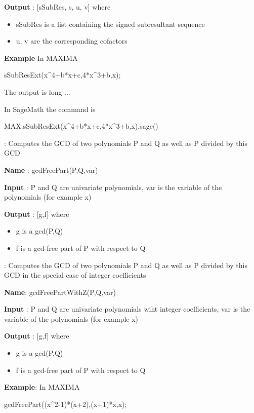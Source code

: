 \documentclass{article}
\begin{document}
  {\bf Output} : [sSubRes, s, u, v] where
  \begin{itemize}
  
    \item sSubRes is a list containing the signed subresultant sequence
    
    \item u, v are the corresponding cofactors
  \end{itemize}
  
{\bf Example} In MAXIMA

sSubResExt(x\^{}4+b*x+c,4*x\^{}3+b,x);

 \noindent The output is long ...
  
  \noindent In SageMath the command is
  
  MAX.sSubResExt(x\^{}4+b*x+c,4*x\^{}3+b,x).sage()
  

:
  Computes the GCD of two polynomials P and Q as well as P divided by this GCD
  
{\bf Name} : gcdFreePart(P,Q,var)
  
  {\bf Input} : P and Q are univariate polynomials, var is the variable of the polynomials (for example x)
  
 {\bf  Output} : [g,f] where
  \begin{itemize}
    \item g is a gcd(P,Q)
    \item f is a gcd-free part of P with respect to Q
  \end{itemize}
  
  :
  Computes the GCD of two polynomials P and Q as well as P divided by this GCD in the special case of integer coefficients
  
  {\bf Name}: gcdFreePartWithZ(P,Q,var)
  
  {\bf Input} : P and Q are univariate polynomials wiht integer coefficients, var is the variable of the polynomials (for example x)
  
  {\bf Output} : [g,f] where
  \begin{itemize}
   \item g is a gcd(P,Q)
    \item f is a gcd-free part of P with respect to Q
  \end{itemize}
  
{\bf Example}: In MAXIMA

gcdFreePart((x\^{}2-1)*(x+2),(x+1)*x,x);
\end{document}
